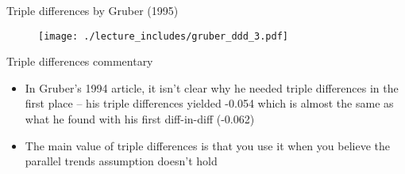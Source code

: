 \documentclass{beamer}
\begin{document}
\begin{frame}{Triple differences by Gruber (1995)}
	
	\begin{figure}
	\texttt{[image: ./lecture\_includes/gruber\_ddd\_3.pdf]}
	\end{figure}
	
\end{frame}

\begin{frame}{Triple differences commentary}

\begin{itemize}

\item In Gruber's 1994 article, it isn't clear why he needed triple differences in the first place -- his triple differences yielded -0.054 which is almost the same as what he found with his first diff-in-diff (-0.062)
\item The main value of triple differences is that you use it when you believe the parallel trends assumption doesn't hold

\end{itemize}

\end{frame}
\end{document}
